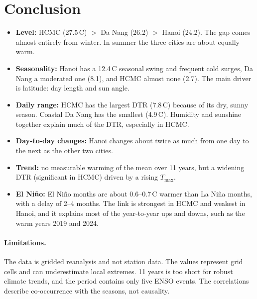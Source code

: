 \documentclass[11pt,a4paper]{article}
\begin{document}
\section{Conclusion}
\begin{itemize}
    \item \textbf{Level:} HCMC (27.5\,\textdegree C) $>$ Da Nang (26.2) $>$ Hanoi (24.2). The gap comes almost entirely from winter.
    In summer the three cities are about equally warm.
    \item \textbf{Seasonality:} Hanoi has a 12.4\,\textdegree C seasonal swing and frequent cold surges, Da Nang a moderated one (8.1),
    and HCMC almost none (2.7). The main driver is latitude: day length and sun angle.
    \item \textbf{Daily range:} HCMC has the largest DTR (7.8\,\textdegree C) because of its dry, sunny season.
    Coastal Da Nang has the smallest (4.9\,\textdegree C). Humidity and sunshine together explain much of the DTR, especially in HCMC.
    \item \textbf{Day-to-day changes:} Hanoi changes about twice as much from one day to the next as the other two cities.
    \item \textbf{Trend:} no measurable warming of the mean over 11 years, but a widening DTR (significant in HCMC) driven by a rising $T_{\max}$.
    \item \textbf{El Niño:} El Niño months are about 0.6--0.7\,\textdegree C warmer than La Niña months, with a delay of 2--4 months.
    The link is strongest in HCMC and weakest in Hanoi, and it explains most of the year-to-year ups and downs, such as the warm years 2019 and 2024.
\end{itemize}

\paragraph{Limitations.}
The data is gridded reanalysis and not station data. The values represent grid cells and can underestimate local extremes.
11 years is too short for robust climate trends, and the period contains only five ENSO events.
The correlations describe co-occurrence with the seasons, not causality.
\end{document}
